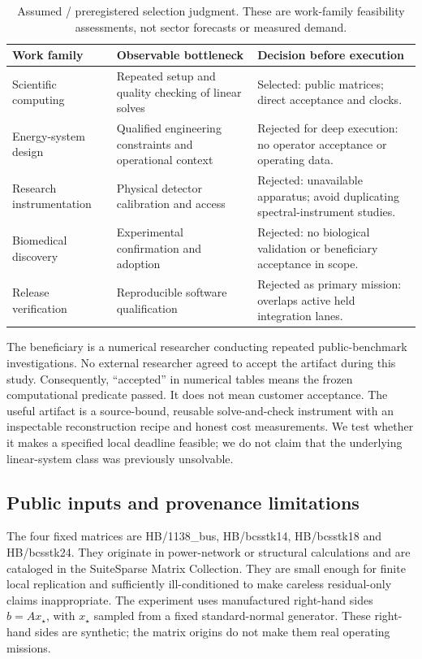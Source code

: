 \documentclass[11pt,a4paper]{article}
\newcommand{\assum}{\textsf{Assumed}}
\begin{document}
\begin{table}[ht]
\centering\small
\begin{tabularx}{\linewidth}{@{}L{28mm}YY@{}}\toprule
Work family & Observable bottleneck & Decision before execution \\\midrule
Scientific computing & Repeated setup and quality checking of linear solves & Selected: public matrices; direct acceptance and clocks. \\
Energy-system design & Qualified engineering constraints and operational context & Rejected for deep execution: no operator acceptance or operating data. \\
Research instrumentation & Physical detector calibration and access & Rejected: unavailable apparatus; avoid duplicating spectral-instrument studies. \\
Biomedical discovery & Experimental confirmation and adoption & Rejected: no biological validation or beneficiary acceptance in scope. \\
Release verification & Reproducible software qualification & Rejected as primary mission: overlaps active held integration lanes. \\\bottomrule
\end{tabularx}
\caption{\assum{} / preregistered selection judgment. These are work-family feasibility assessments, not sector forecasts or measured demand.}
\label{tab:missions}
\end{table}

The beneficiary is a numerical researcher conducting repeated public-benchmark investigations. No external researcher agreed to accept the artifact during this study. Consequently, ``accepted'' in numerical tables means the frozen computational predicate passed. It does not mean customer acceptance. The useful artifact is a source-bound, reusable solve-and-check instrument with an inspectable reconstruction recipe and honest cost measurements. We test whether it makes a specified local deadline feasible; we do not claim that the underlying linear-system class was previously unsolvable.

\subsection{Public inputs and provenance limitations}
The four fixed matrices are HB/1138\_bus, HB/bcsstk14, HB/bcsstk18 and HB/bcsstk24. They originate in power-network or structural calculations and are cataloged in the SuiteSparse Matrix Collection. \citep{davis2011,kolodziej2019} They are small enough for finite local replication and sufficiently ill-conditioned to make careless residual-only claims inappropriate. The experiment uses manufactured right-hand sides $b=Ax_\star$, with $x_\star$ sampled from a fixed standard-normal generator. These right-hand sides are synthetic; the matrix origins do not make them real operating missions.
\end{document}
